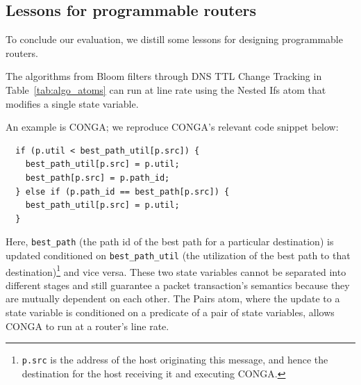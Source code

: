 \subsection{Lessons for programmable routers}
\label{ss:lessons}

To conclude our evaluation, we distill some lessons for designing programmable
routers.

 The algorithms from Bloom filters through DNS TTL Change Tracking
in Table~\ref{tab:algo_atoms} can run at line rate using the Nested Ifs atom
that modifies a single state variable.

An example is CONGA; we reproduce CONGA's relevant code snippet below:
\begin{verbatim}
  if (p.util < best_path_util[p.src]) {
    best_path_util[p.src] = p.util;
    best_path[p.src] = p.path_id;
  } else if (p.path_id == best_path[p.src]) {
    best_path_util[p.src] = p.util;
  }
\end{verbatim}
Here, \texttt{best\_path} (the path id of the best path for a particular
destination) is updated conditioned on \texttt{best\_path\_util} (the
utilization of the best path to that destination)\footnote{{\tt p.src} is the
address of the host originating this message, and hence the destination for the
host receiving it and executing CONGA.} and vice versa. These two state
variables cannot be separated into different stages and still guarantee a
packet transaction's semantics because they are mutually dependent on each
other.  The Pairs atom, where the update to a state variable is conditioned on
a predicate of a pair of state variables, allows CONGA to run at a router's line rate.

